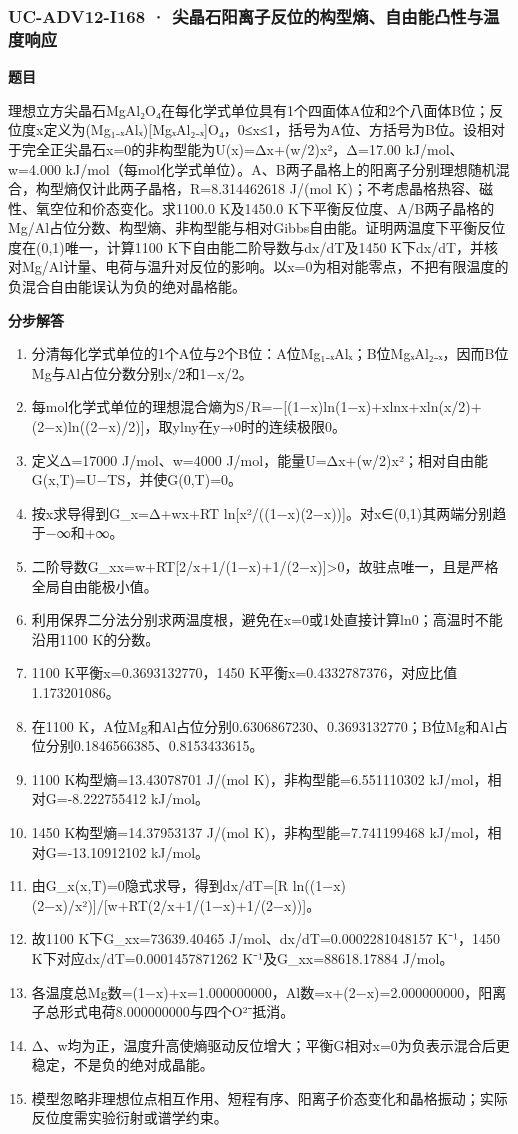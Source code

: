 \documentclass[UTF8,11pt,a4paper]{ctexart}
\begin{document}
\subsubsection*{UC-ADV12-I168 · 尖晶石阳离子反位的构型熵、自由能凸性与温度响应}
\noindent\textbf{题目}\par
理想立方尖晶石MgAl₂O₄在每化学式单位具有1个四面体A位和2个八面体B位；反位度x定义为(Mg₁₋ₓAlₓ)[MgₓAl₂₋ₓ]O₄，0≤x≤1，括号为A位、方括号为B位。设相对于完全正尖晶石x=0的非构型能为U(x)=Δx+(w/2)x²，Δ=17.00 kJ/mol、w=4.000 kJ/mol（每mol化学式单位）。A、B两子晶格上的阳离子分别理想随机混合，构型熵仅计此两子晶格，R=8.314462618 J/(mol K)；不考虑晶格热容、磁性、氧空位和价态变化。求1100.0 K及1450.0 K下平衡反位度、A/B两子晶格的Mg/Al占位分数、构型熵、非构型能与相对Gibbs自由能。证明两温度下平衡反位度在(0,1)唯一，计算1100 K下自由能二阶导数与dx/dT及1450 K下dx/dT，并核对Mg/Al计量、电荷与温升对反位的影响。以x=0为相对能零点，不把有限温度的负混合自由能误认为负的绝对晶格能。\par
\medskip\noindent\textbf{分步解答}
\begin{enumerate}
\item 分清每化学式单位的1个A位与2个B位：A位Mg₁₋ₓAlₓ；B位MgₓAl₂₋ₓ，因而B位Mg与Al占位分数分别x/2和1−x/2。
\item 每mol化学式单位的理想混合熵为S/R=−[(1−x)ln(1−x)+xlnx+xln(x/2)+(2−x)ln((2−x)/2)]，取ylny在y→0时的连续极限0。
\item 定义Δ=17000 J/mol、w=4000 J/mol，能量U=Δx+(w/2)x²；相对自由能G(x,T)=U−TS，并使G(0,T)=0。
\item 按x求导得到G\_x=Δ+wx+RT ln[x²/((1−x)(2−x))]。对x∈(0,1)其两端分别趋于−∞和+∞。
\item 二阶导数G\_xx=w+RT[2/x+1/(1−x)+1/(2−x)]>0，故驻点唯一，且是严格全局自由能极小值。
\item 利用保界二分法分别求两温度根，避免在x=0或1处直接计算ln0；高温时不能沿用1100 K的分数。
\item 1100 K平衡x=0.3693132770，1450 K平衡x=0.4332787376，对应比值1.173201086。
\item 在1100 K，A位Mg和Al占位分别0.6306867230、0.3693132770；B位Mg和Al占位分别0.1846566385、0.8153433615。
\item 1100 K构型熵=13.43078701 J/(mol K)，非构型能=6.551110302 kJ/mol，相对G=-8.222755412 kJ/mol。
\item 1450 K构型熵=14.37953137 J/(mol K)，非构型能=7.741199468 kJ/mol，相对G=-13.10912102 kJ/mol。
\item 由G\_x(x,T)=0隐式求导，得到dx/dT=[R ln((1−x)(2−x)/x²)]/[w+RT(2/x+1/(1−x)+1/(2−x))]。
\item 故1100 K下G\_xx=73639.40465 J/mol、dx/dT=0.0002281048157 K⁻¹，1450 K下对应dx/dT=0.0001457871262 K⁻¹及G\_xx=88618.17884 J/mol。
\item 各温度总Mg数=(1−x)+x=1.000000000，Al数=x+(2−x)=2.000000000，阳离子总形式电荷8.000000000与四个O²⁻抵消。
\item Δ、w均为正，温度升高使熵驱动反位增大；平衡G相对x=0为负表示混合后更稳定，不是负的绝对成晶能。
\item 模型忽略非理想位点相互作用、短程有序、阳离子价态变化和晶格振动；实际反位度需实验衍射或谱学约束。
\end{enumerate}
\end{document}
